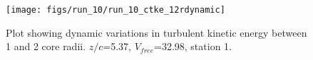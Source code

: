\begin{figure}[H]
\centering
\texttt{[image: figs/run\_10/run\_10\_ctke\_12rdynamic]}
\caption{Plot showing dynamic variations in turbulent kinetic energy between 1 and 2 core radii. $z/c$=5.37, $V_{free}$=32.98, station 1.}
\label{fig:run_10_ctke_12rdynamic}
\end{figure}


